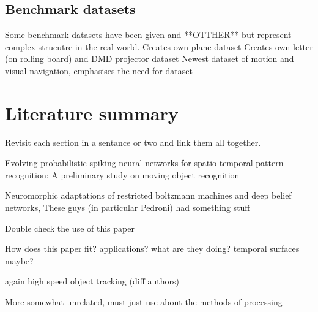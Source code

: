 \subsection{Benchmark datasets}
Some benchmark datasets have been given \cite{Gibson2014} and **OTTHER** but represent complex strucutre in the real world.
Creates own plane dataset \cite{afshar2016investigation}
Creates own letter (on rolling board) and DMD projector dataset \cite{akolkar2015can}
Newest dataset of motion and visual navigation, emphasises the need for dataset \cite{barranco2016dataset}


\section{Literature summary}      %
Revisit each section in a sentance or two and link them all together.

Evolving probabilistic spiking neural networks for spatio-temporal pattern recognition: A preliminary study on moving object recognition \cite{kasabov2011evolving}

Neuromorphic adaptations of restricted boltzmann machines and deep belief networks, These guys (in particular Pedroni) had something stuff \cite{pedroni2013neuromorphic}


Double check the use of this paper \cite{gil2014active}

How does this paper fit? applications? what are they doing? temporal surfaces maybe? \cite{davide2014high}

again high speed object tracking (diff authors) \cite{saner2014high} 

More somewhat unrelated, must just use about the methods of processing \cite{mueggler2015continuous}
